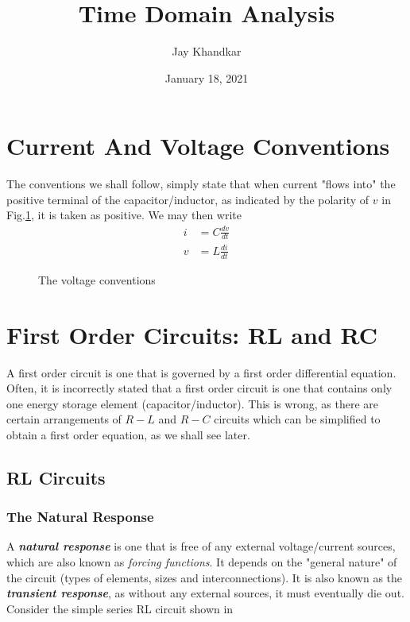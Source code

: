 \documentclass{article}
\title{\textbf{Time Domain Analysis}}
\author{Jay Khandkar}
\date{January 18, 2021}
\begin{document}
\maketitle
\newpage
\tableofcontents
\newpage

\color{blue}
\section{Current And Voltage Conventions}
\color{black}

The conventions we shall follow, simply state that when 
current "flows into" the positive terminal of the capacitor/inductor, as indicated by the polarity of $v$
in Fig.\ref{fig:conventions}, it is taken as positive. We may then write
\begin{align*}
i &= C\frac{dv}{dt}\\
v &= L\frac{di}{dt}
\end{align*}

\begin{figure}[h!]
\centering
{}
\caption{The voltage conventions}
\label{fig:conventions}	
\end{figure}

\color{blue}
\section{First Order Circuits: RL and RC}
\color{black}
A first order circuit is one that is governed by a first order differential equation. Often, it is
incorrectly stated that a first order circuit is one that contains only one energy storage element
(capacitor/inductor). This is wrong, as there are certain arrangements of $R-L$ and $R-C$ circuits
which can be simplified to obtain a first order equation, as we shall see later.

\color{blue}
\subsection{RL Circuits}
\subsubsection{The Natural Response}
\color{black}
A \textbf{\textit{natural response}} is one that is free of any external voltage/current sources, 
which are also known as \textit{forcing functions}. It depends on the "general nature" of the circuit (types of elements, sizes and interconnections). It is also known as the \textbf{\textit{transient response}}, as without any external sources, it must eventually die out. Consider the simple series RL
circuit shown in 
\end{document}
